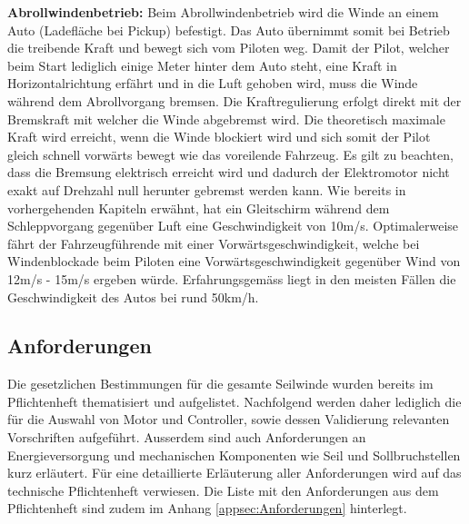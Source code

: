 \textbf{Abrollwindenbetrieb:}
Beim Abrollwindenbetrieb wird die Winde an einem Auto (Ladefläche bei Pickup) befestigt. Das Auto übernimmt somit bei Betrieb die treibende Kraft und bewegt sich vom Piloten weg. Damit der Pilot, welcher beim Start lediglich einige Meter hinter dem Auto steht, eine Kraft in Horizontalrichtung erfährt und in die Luft gehoben wird, muss die Winde während dem Abrollvorgang bremsen. Die Kraftregulierung erfolgt direkt mit der Bremskraft mit welcher die Winde abgebremst wird. Die theoretisch maximale Kraft wird erreicht, wenn die Winde blockiert wird und sich somit der Pilot gleich schnell vorwärts bewegt wie das voreilende Fahrzeug. Es gilt zu beachten, dass die Bremsung elektrisch erreicht wird und dadurch der Elektromotor nicht exakt auf Drehzahl null herunter gebremst werden kann. Wie bereits in vorhergehenden Kapiteln erwähnt, hat ein Gleitschirm während dem Schleppvorgang gegenüber Luft eine Geschwindigkeit von 10m/s. Optimalerweise fährt der Fahrzeugführende mit einer Vorwärtsgeschwindigkeit, welche bei Windenblockade beim Piloten eine Vorwärtsgeschwindigkeit gegenüber Wind von 12m/s - 15m/s ergeben würde. Erfahrungsgemäss liegt in den meisten Fällen die Geschwindigkeit des Autos bei rund 50km/h.


\subsection{Anforderungen}\label{subsec:Richtlinien}
Die gesetzlichen Bestimmungen für die gesamte Seilwinde wurden bereits im Pflichtenheft thematisiert und aufgelistet. Nachfolgend werden daher lediglich die für die Auswahl von Motor und Controller, sowie dessen Validierung relevanten Vorschriften aufgeführt. Ausserdem sind auch Anforderungen an Energieversorgung und mechanischen Komponenten wie Seil und Sollbruchstellen kurz erläutert. Für eine detaillierte Erläuterung aller Anforderungen wird auf das technische Pflichtenheft \cite{TechPflichtenheft} verwiesen. Die Liste mit den Anforderungen aus dem Pflichtenheft sind zudem im Anhang \ref{appsec:Anforderungen} hinterlegt.

